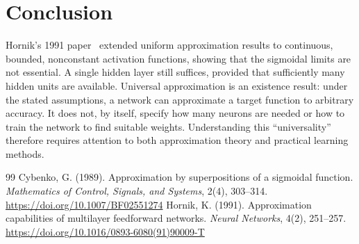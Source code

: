 \documentclass[12pt]{article}
\begin{document}
\section{Conclusion}
Hornik's 1991 paper~\cite{hornik1991} extended uniform approximation results to continuous, bounded, nonconstant activation functions, showing that the sigmoidal limits are not essential. A single hidden layer still suffices, provided that sufficiently many hidden units are available. Universal approximation is an existence result: under the stated assumptions, a network can approximate a target function to arbitrary accuracy. It does not, by itself, specify how many neurons are needed or how to train the network to find suitable weights. Understanding this ``universality'' therefore requires attention to both approximation theory and practical learning methods.

\begin{thebibliography}{99}
     Cybenko, G. (1989). Approximation by superpositions of a sigmoidal function. \emph{Mathematics of Control, Signals, and Systems}, 2(4), 303--314. \url{https://doi.org/10.1007/BF02551274}
     Hornik, K. (1991). Approximation capabilities of multilayer feedforward networks. \emph{Neural Networks}, 4(2), 251--257. \url{https://doi.org/10.1016/0893-6080(91)90009-T}
\end{thebibliography}
\end{document}
